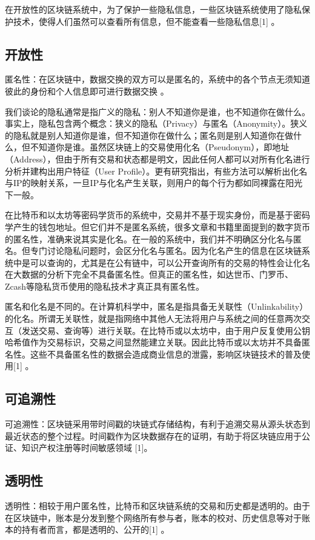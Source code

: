 在开放性的区块链系统中，为了保护一些隐私信息，一些区块链系统使用了隐私保护技术，使得人们虽然可以查看所有信息，但不能查看一些隐私信息[1] 。

\subsection{开放性}
匿名性：在区块链中，数据交换的双方可以是匿名的，系统中的各个节点无须知道彼此的身份和个人信息即可进行数据交换 。
	
我们谈论的隐私通常是指广义的隐私：别人不知道你是谁，也不知道你在做什么。事实上，隐私包含两个概念：狭义的隐私（Privacy）与匿名（Anonymity）。狭义的隐私就是别人知道你是谁，但不知道你在做什么；匿名则是别人知道你在做什么，但不知道你是谁。虽然区块链上的交易使用化名（Pseudonym），即地址（Address），但由于所有交易和状态都是明文，因此任何人都可以对所有化名进行分析并建构出用户特征（User Profile）。更有研究指出，有些方法可以解析出化名与IP的映射关系，一旦IP与化名产生关联，则用户的每个行为都如同裸露在阳光下一般。

在比特币和以太坊等密码学货币的系统中，交易并不基于现实身份，而是基于密码学产生的钱包地址。但它们并不是匿名系统，很多文章和书籍里面提到的数字货币的匿名性，准确来说其实是化名。在一般的系统中，我们并不明确区分化名与匿名。但专门讨论隐私问题时，会区分化名与匿名。因为化名产生的信息在区块链系统中是可以查询的，尤其是在公有链中，可以公开查询所有的交易的特性会让化名在大数据的分析下完全不具备匿名性。但真正的匿名性，如达世币、门罗币、Zcash等隐私货币使用的隐私技术才真正具有匿名性。

匿名和化名是不同的。在计算机科学中，匿名是指具备无关联性（Unlinkability）的化名。所谓无关联性，就是指网络中其他人无法将用户与系统之间的任意两次交互（发送交易、查询等）进行关联。在比特币或以太坊中，由于用户反复使用公钥哈希值作为交易标识，交易之间显然能建立关联。因此比特币或以太坊并不具备匿名性。这些不具备匿名性的数据会造成商业信息的泄露，影响区块链技术的普及使用[1] 。
	
\subsection{可追溯性}
可追溯性：区块链采用带时间戳的块链式存储结构，有利于追溯交易从源头状态到最近状态的整个过程。时间戳作为区块数据存在的证明，有助于将区块链应用于公证、知识产权注册等时间敏感领域 [1]。

\subsection{透明性}
透明性：相较于用户匿名性，比特币和区块链系统的交易和历史都是透明的。由于在区块链中，账本是分发到整个网络所有参与者，账本的校对、历史信息等对于账本的持有者而言，都是透明的、公开的[1] 。

